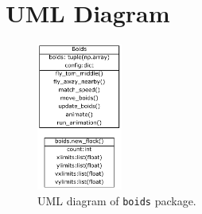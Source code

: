 \documentclass{article}
\begin{document}
\section*{UML Diagram}
\begin{figure}[h]
\centering
\includegraphics[width=0.25\textwidth]{UML}
\caption{UML diagram of \texttt{boids} package.}
\label{fig:UML}
\end{figure}
\end{document}
